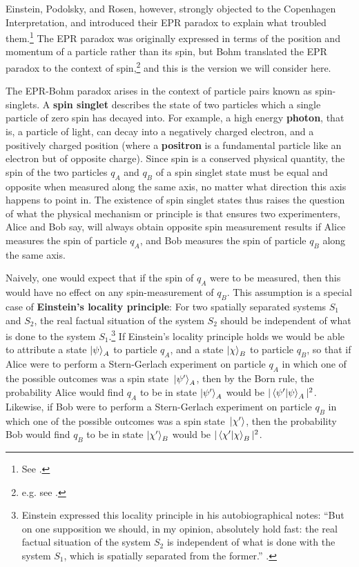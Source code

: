 Einstein, Podolsky, and Rosen, however, strongly objected to the Copenhagen Interpretation, and introduced their EPR paradox to explain what troubled them.\footnote{See \cite{EinsteinPodolskyRosen}.} The EPR paradox was originally expressed in terms of the position and momentum of a particle rather than its spin, but Bohm translated the EPR paradox to the context of spin,\footnote{e.g. see \cite[p. 29, Ch. 5 sec. 3, and Ch. 22 sec. 19]{BohmQuantumTheory}. } and this is the version we will consider here. 

The EPR-Bohm paradox arises in the context of particle pairs known as spin-singlets. A \textbf{spin singlet} describes the state of two particles which a single particle of zero spin has decayed into. For example, a high energy \textbf{photon}, that is, a particle of light, can decay into a negatively charged electron, and a positively charged position (where a \textbf{positron} is a fundamental particle like an electron but of opposite charge). Since spin is a conserved physical quantity, the spin of the two particles $q_A$ and $q_B$ of a spin singlet state must be equal and opposite when measured along the same axis, no matter what direction this axis happens to point in. The existence of spin singlet states thus raises the question of what the physical mechanism or principle is that ensures two experimenters, Alice and Bob say, will always obtain opposite spin measurement results if Alice measures the spin of particle $q_A$, and Bob measures the spin of particle $q_B$ along the same axis. 

Naively, one would expect that if the spin of $q_A$ were to be measured, then this would have no effect on any spin-measurement of $q_B$. This assumption is a special case of \textbf{Einstein's locality principle}: For two spatially separated systems $S_1$ and $S_2$,  the real factual situation of the system $S_2$ should be independent of what is done to the system $S_1$.\footnote{Einstein expressed this locality principle in his autobiographical notes: ``But on one supposition we should, in my opinion, absolutely hold fast: the real factual situation of the system $S_2$ is independent of what is done with the system $S_1$, which is spatially separated from the former.'' \cite[p. 85]{EinsteinLocality}.} If Einstein's locality principle holds we would be able to attribute a state $\ket{\psi}_A$ to particle $q_A$, and a state $\ket{\chi}_B$ to particle $q_B$, so that if Alice were to perform a Stern-Gerlach experiment on particle $q_A$ in which one of the possible outcomes was a spin state $\ket*{\psi'}_A$, then by the Born rule, the probability Alice would find $q_A$ to be in state $\ket{\psi'}_A$ would be $|\ip{\psi'}{\psi}_A|^2$. Likewise, if Bob were to perform a Stern-Gerlach experiment on particle $q_B$ in which one of the possible outcomes was a spin state $\ket*{\chi'}$, then the probability Bob would find $q_B$ to be in state $\ket{\chi'}_B$ would be $|\ip{\chi'}{\chi}_B|^2$. 

